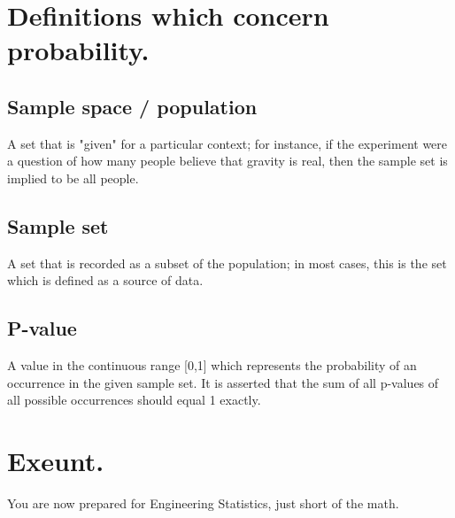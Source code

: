 \documentclass[]{article}
\begin{document}
	\section{Definitions which concern probability.}
		\subsection{Sample space / population}
			A set that is "given" for a particular context; for instance, if the experiment were a question of how many people believe that gravity is real, then the sample set is implied to be all people. 
		\subsection{Sample set}
			A set that is recorded as a subset of the population; in most cases, this is the set which is defined as a source of data.
		\subsection{P-value}
			A value in the continuous range [0,1] which represents the probability of an occurrence in the given sample set. It is asserted that the sum of all p-values of all possible occurrences should equal 1 exactly.

	\pagebreak
	
	\section{Exeunt.}
		You are now prepared for Engineering Statistics, just short of the math.
\end{document}
